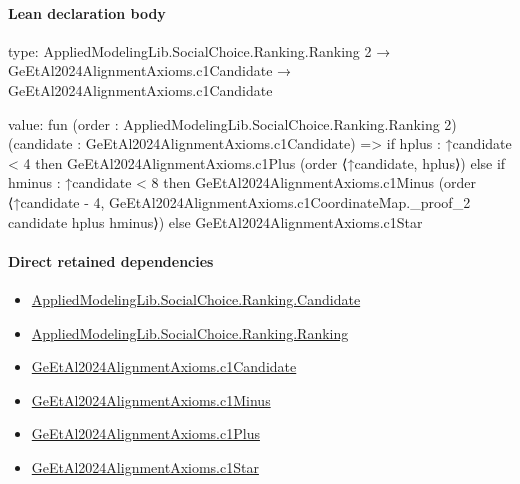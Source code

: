 \documentclass[10pt]{article}
\begin{document}
\paragraph{Lean declaration body}
\begin{ReviewVerbatim}
type:
AppliedModelingLib.SocialChoice.Ranking.Ranking 2 →
  GeEtAl2024AlignmentAxioms.c1Candidate → GeEtAl2024AlignmentAxioms.c1Candidate

value:
fun (order : AppliedModelingLib.SocialChoice.Ranking.Ranking 2) (candidate : GeEtAl2024AlignmentAxioms.c1Candidate) =>
  if hplus : ↑candidate < 4 then GeEtAl2024AlignmentAxioms.c1Plus (order ⟨↑candidate, hplus⟩)
  else
    if hminus : ↑candidate < 8 then
      GeEtAl2024AlignmentAxioms.c1Minus
        (order ⟨↑candidate - 4, GeEtAl2024AlignmentAxioms.c1CoordinateMap._proof_2 candidate hplus hminus⟩)
    else GeEtAl2024AlignmentAxioms.c1Star
\end{ReviewVerbatim}

\paragraph{Direct retained dependencies}
\begin{itemize}\raggedright
\item \hyperlink{library-prerequisite-8c0e6c25845ae78a}{Applied\allowbreak{}Modeling\allowbreak{}Lib.\allowbreak{}Social\allowbreak{}Choice.\allowbreak{}Ranking.\allowbreak{}Candidate}
\item \hyperlink{library-prerequisite-5cde54446d1ae021}{Applied\allowbreak{}Modeling\allowbreak{}Lib.\allowbreak{}Social\allowbreak{}Choice.\allowbreak{}Ranking.\allowbreak{}Ranking}
\item \hyperlink{governing-declaration-af438838d6b7577a}{Ge\allowbreak{}Et\allowbreak{}Al2024\allowbreak{}Alignment\allowbreak{}Axioms.\allowbreak{}c1\allowbreak{}Candidate}
\item \hyperlink{governing-declaration-122548010cfd0bc1}{Ge\allowbreak{}Et\allowbreak{}Al2024\allowbreak{}Alignment\allowbreak{}Axioms.\allowbreak{}c1\allowbreak{}Minus}
\item \hyperlink{governing-declaration-35999c99f892cd4f}{Ge\allowbreak{}Et\allowbreak{}Al2024\allowbreak{}Alignment\allowbreak{}Axioms.\allowbreak{}c1\allowbreak{}Plus}
\item \hyperlink{governing-declaration-193e4147a4967bc7}{Ge\allowbreak{}Et\allowbreak{}Al2024\allowbreak{}Alignment\allowbreak{}Axioms.\allowbreak{}c1\allowbreak{}Star}
\end{itemize}
\hypertarget{governing-declaration-ac03621d79648ced}{}
\end{document}
